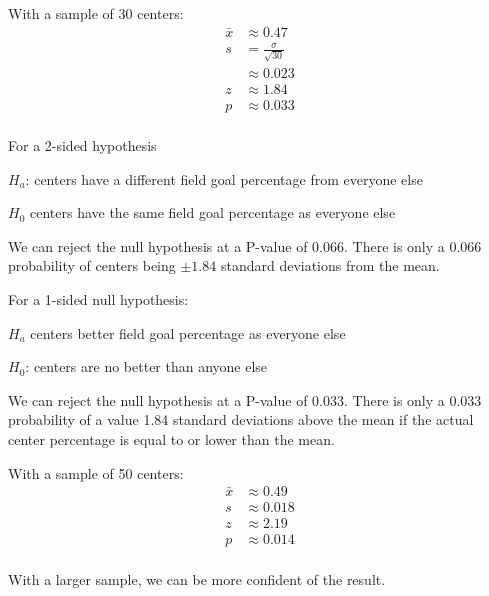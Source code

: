 \documentclass[letterpaper, landscape]{exam}
\begin{document}
  With a sample of 30 centers:
  \begin{align*}
    \bar{x} & \approx 0.47 \\
    s       & = \frac{\sigma}{\sqrt{30}} \\
            & \approx 0.023 \\
    z       & \approx 1.84 \\
    p       & \approx 0.033 \\
  \end{align*}

  For a 2-sided hypothesis 
  \begin{itemize*}
    \item $H_a$: centers have a different field goal percentage from everyone
      else
    \item $H_0$ centers have the same field goal percentage as everyone else
  \end{itemize*}
  
  We can reject the null hypothesis at a P-value of 0.066.  There is only a
  0.066 probability of centers being $\pm 1.84$ standard deviations from the
  mean.

  For a 1-sided null hypothesis: 
  \begin{itemize*}
    \item $H_a$ centers better field goal percentage as everyone else
    \item $H_0$: centers are no better than anyone else
  \end{itemize*}
  
  We can reject the null hypothesis at a P-value of 0.033.  There is only a
  0.033 probability of a value 1.84 standard deviations above the mean if the
  actual center percentage is equal to or lower than the mean.

  With a sample of 50 centers:
  \begin{align*}
    \bar{x} & \approx 0.49 \\
    s       & \approx 0.018 \\
    z       & \approx 2.19 \\
    p       & \approx 0.014 \\
  \end{align*}

  With a larger sample, we can be more confident of the result.

\end{document}
